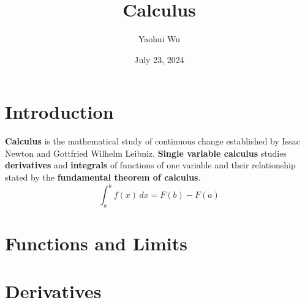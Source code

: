 \documentclass[12pt]{article}
\title{Calculus}
\author{Yaohui Wu}
\date{July 23, 2024}
\begin{document}
\maketitle

\section*{Introduction}
\textbf{Calculus} is the mathematical study of continuous change established
by Issac Newton and Gottfried Wilhelm Leibniz.
\textbf{Single variable calculus} studies \textbf{derivatives} and
\textbf{integrals} of functions of one variable and their relationship stated
by the \textbf{fundamental theorem of calculus}.
\[\int_a^b f(x)\,dx=F(b)-F(a)\]

\tableofcontents
\newpage

\section{Functions and Limits}






\section{Derivatives}



% 
% 
% 

% 
% 
% 
% 

% 
% 
% 
% 
\end{document}
